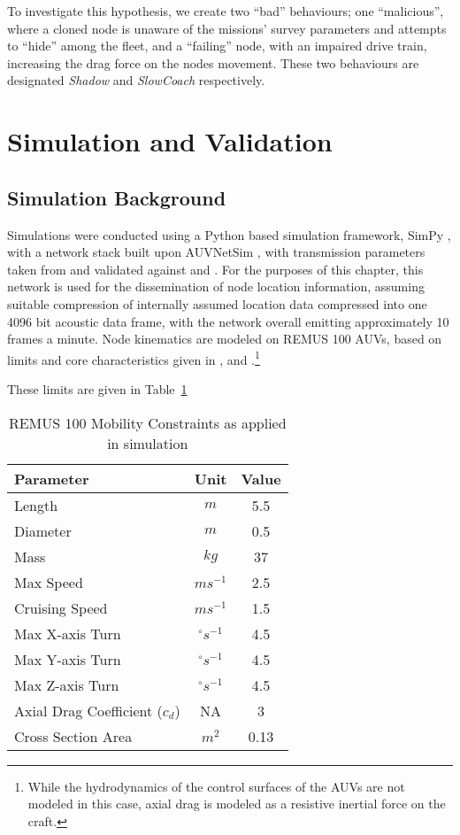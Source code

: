 To investigate this hypothesis, we create two ``bad'' behaviours; one ``malicious'', where a cloned node is unaware of the missions' survey parameters and attempts to ``hide'' among the fleet, and a ``failing'' node, with an impaired drive train, increasing the drag force on the nodes movement.
These two behaviours are designated \emph{Shadow} and \emph{SlowCoach} respectively.

\section{Simulation and Validation}\label{sec:sim_and_valid}

\subsection{Simulation Background}

Simulations were conducted using a Python based simulation framework, SimPy \cite{Mueller2003SimPy}, with a network stack built upon AUVNetSim \cite{Miquel2008}, with transmission parameters taken from and validated against \cite{Stojanovic2007} and \cite{Stefanov2011}.
For the purposes of this chapter, this network is used for the dissemination of node location information, assuming suitable compression of internally assumed location data compressed into one 4096 bit acoustic data frame, with the network overall emitting approximately 10 frames a minute.
Node kinematics are modeled on REMUS 100 AUVs, based on limits and core characteristics given in \cite{Mcewen2001}, \cite{Milgram2001} and \cite{Samad2011}.\footnote{While the hydrodynamics of the control surfaces of the AUVs are not modeled in this case, axial drag is modeled as a resistive inertial force on the craft.}

These limits are given in Table~\ref{tab:mobility_sysconstraints}
\begin{table}[h]
  \caption{REMUS 100 Mobility Constraints as applied in simulation} \label{tab:mobility_sysconstraints}
  \begin{center}
    \setlength{\tabcolsep}{8pt}
    \begin{tabular}{lcc}
      \toprule
      Parameter & Unit & Value \\
      \midrule
      Length & $m$ & 5.5\\
      Diameter & $m$ & 0.5\\
      Mass & $kg$ & 37 \\ 
      Max Speed & $ms^{-1}$ & 2.5\\
      Cruising Speed & $ms^{-1}$ & 1.5\\
      Max X-axis Turn & $^{\circ} s^{-1}$ & 4.5\\
      Max Y-axis Turn & $^{\circ} s^{-1}$ & 4.5\\
      Max Z-axis Turn & $^{\circ} s^{-1}$ & 4.5\\
      Axial Drag Coefficient ($c_d$) & NA & 3\\
      Cross Section Area & $m^2$ & 0.13\\
      \bottomrule
    \end{tabular}
    \setlength{\tabcolsep}{6pt}
  \end{center}
\end{table}

